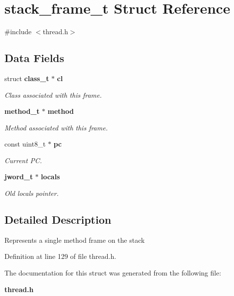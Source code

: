 \section{stack\_\-frame\_\-t Struct Reference}
\label{structstack__frame__t}


{\ttfamily \#include $<$thread.h$>$}

\subsection*{Data Fields}
\begin{DoxyCompactItemize}
\item 
struct {\bf class\_\-t} $\ast$ {\bf cl}\label{structstack__frame__t_a88915b7aeec16d979d0a205fe8524251}

\begin{DoxyCompactList}\small\item\em Class associated with this frame. \item\end{DoxyCompactList}\item 
{\bf method\_\-t} $\ast$ {\bf method}\label{structstack__frame__t_ae70377cb515c48e77e90732d2ef3ed29}

\begin{DoxyCompactList}\small\item\em Method associated with this frame. \item\end{DoxyCompactList}\item 
const uint8\_\-t $\ast$ {\bf pc}\label{structstack__frame__t_a9d08a94a2fcd9d11490d3c1a1d643559}

\begin{DoxyCompactList}\small\item\em Current PC. \item\end{DoxyCompactList}\item 
{\bf jword\_\-t} $\ast$ {\bf locals}\label{structstack__frame__t_a4cd9ce82dc5363b25c6780ca6018a800}

\begin{DoxyCompactList}\small\item\em Old locals pointer. \item\end{DoxyCompactList}\end{DoxyCompactItemize}


\subsection{Detailed Description}
Represents a single method frame on the stack 

Definition at line 129 of file thread.h.



The documentation for this struct was generated from the following file:\begin{DoxyCompactItemize}
\item 
{\bf thread.h}\end{DoxyCompactItemize}
